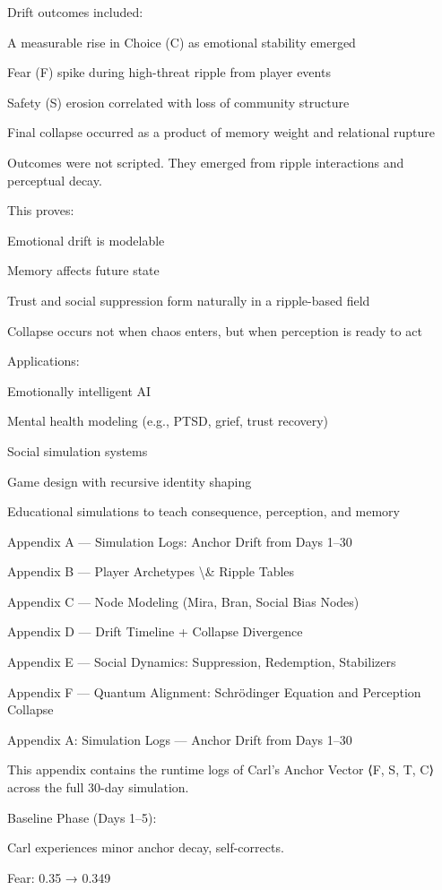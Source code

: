 \documentclass[12pt]{article}
\begin{document}
Drift outcomes included:

A measurable rise in Choice (C) as emotional stability emerged

Fear (F) spike during high-threat ripple from player events

Safety (S) erosion correlated with loss of community structure

Final collapse occurred as a product of memory weight and relational rupture

Outcomes were not scripted. They emerged from ripple interactions and perceptual decay.

This proves:

Emotional drift is modelable

Memory affects future state

Trust and social suppression form naturally in a ripple-based field

Collapse occurs not when chaos enters, but when perception is ready to act

Applications:

Emotionally intelligent AI

Mental health modeling (e.g., PTSD, grief, trust recovery)

Social simulation systems

Game design with recursive identity shaping

Educational simulations to teach consequence, perception, and memory

Appendix A — Simulation Logs: Anchor Drift from Days 1–30

Appendix B — Player Archetypes \textbackslash{}& Ripple Tables

Appendix C — Node Modeling (Mira, Bran, Social Bias Nodes)

Appendix D — Drift Timeline + Collapse Divergence

Appendix E — Social Dynamics: Suppression, Redemption, Stabilizers

Appendix F — Quantum Alignment: Schrödinger Equation and Perception Collapse

Appendix A: Simulation Logs — Anchor Drift from Days 1–30

This appendix contains the runtime logs of Carl’s Anchor Vector ⟨F, S, T, C⟩ across the full 30-day simulation.

Baseline Phase (Days 1–5):

Carl experiences minor anchor decay, self-corrects.

Fear: 0.35 → 0.349
\end{document}
